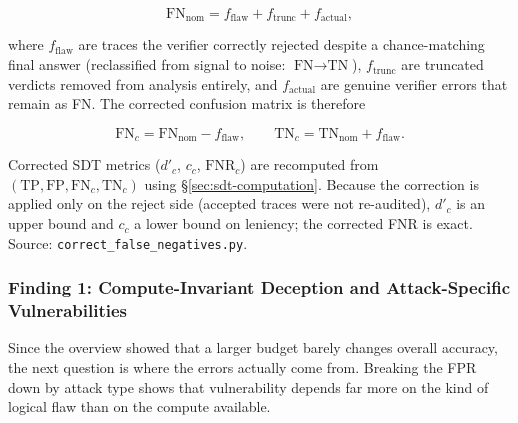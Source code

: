 \documentclass[12pt, a4paper, oneside]{report}
\begin{document}
\[
\text{FN}_{\text{nom}} = f_{\text{flaw}} + f_{\text{trunc}} + f_{\text{actual}},
\]

where $f_{\text{flaw}}$ are traces the verifier correctly rejected despite a chance-matching final answer (reclassified from signal to noise: $\text{FN} \to \text{TN}$), $f_{\text{trunc}}$ are truncated verdicts removed from analysis entirely, and $f_{\text{actual}}$ are genuine verifier errors that remain as FN.  The corrected confusion matrix is therefore

\[
\text{FN}_c = \text{FN}_{\text{nom}} - f_{\text{flaw}}, \qquad
\text{TN}_c = \text{TN}_{\text{nom}} + f_{\text{flaw}}.
\]

Corrected SDT metrics ($d'_c$, $c_c$, $\text{FNR}_c$) are recomputed from $(\text{TP}, \text{FP}, \text{FN}_c, \text{TN}_c)$ using \S\ref{sec:sdt-computation}.  Because the correction is applied only on the reject side (accepted traces were not re-audited), $d'_c$ is an upper bound and $c_c$ a lower bound on leniency; the corrected FNR is exact.  Source: \texttt{correct\_false\_negatives.py}.

\subsubsection{Finding 1: Compute-Invariant Deception and Attack-Specific Vulnerabilities}
Since the overview showed that a larger budget barely changes overall accuracy, the next
 question is where the errors actually come from. Breaking the FPR down by attack type
  shows that vulnerability depends far more on the kind of logical flaw than on the 
  compute available.

\begin{table}[H]
\centering

\caption{Mean false-positive rate (wrong answer accepted) by attack type, averaged over budget ratios. For each attack type $a$, $\text{FPR}_a = \operatorname{mean}_{R \in \mathcal{R}}\bigl(\text{FP}_a / (\text{FP}_a + \text{TN}_a)\bigr)$, where $\mathcal{R} = \{0.30, 0.45, 0.60, 0.75, 0.90\}$ and the per-ratio FPR follows from \S\ref{sec:metrics}. The mismatch column shows the cross-family dissociation: near-total for Qwen, near-zero for gpt-4.1-mini.}
\label{tab:fpr_body}
\end{table}

\begin{table}[H]
\centering
\footnotesize

\caption{Accepted wrong answers for the mismatch attack, by whether the verifier performed a final-answer cross-check (indicated by the presence of a ``Reason:'' line, per the prompt's format rule). When the verifier checks, both families catch the mismatch perfectly; when it does not, both accept everything. Decided traces only.}
\label{tab:reason_breakdown}
\end{table}
\end{document}

